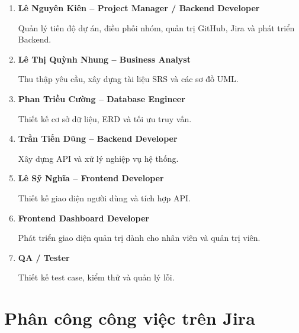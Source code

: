 \begin{enumerate}
    \item \textbf{Lê Nguyên Kiên -- Project Manager / Backend Developer}
    
    Quản lý tiến độ dự án, điều phối nhóm, quản trị GitHub, Jira và phát triển Backend.

    \item \textbf{Lê Thị Quỳnh Nhung -- Business Analyst}
    
    Thu thập yêu cầu, xây dựng tài liệu SRS và các sơ đồ UML.

    \item \textbf{Phan Triều Cường -- Database Engineer}
    
    Thiết kế cơ sở dữ liệu, ERD và tối ưu truy vấn.

    \item \textbf{Trần Tiến Dũng -- Backend Developer}
    
    Xây dựng API và xử lý nghiệp vụ hệ thống.

    \item \textbf{Lê Sỹ Nghĩa -- Frontend Developer}
    
    Thiết kế giao diện người dùng và tích hợp API.

    \item \textbf{Frontend Dashboard Developer}
    
    Phát triển giao diện quản trị dành cho nhân viên và quản trị viên.

    \item \textbf{QA / Tester}
    
    Thiết kế test case, kiểm thử và quản lý lỗi.
\end{enumerate}


\section{Phân công công việc trên Jira}

